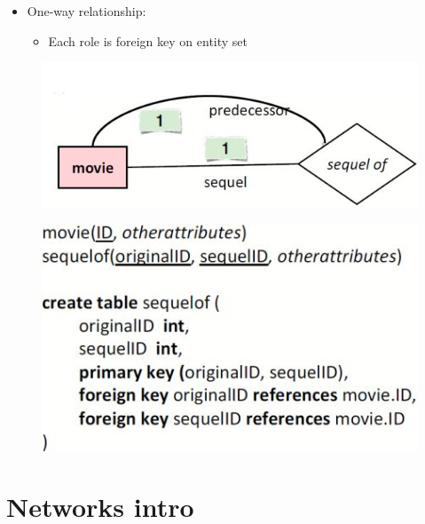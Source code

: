 \documentclass[conference]{IEEEtran}
\begin{document}
\begin{itemize}
    \item One-way relationship:
    \begin{itemize}
        \item Each role is foreign key on entity set
    \end{itemize}
\end{itemize}
\begin{figure} [h!]
    \centering
    \includegraphics[scale=0.5]{Ex32.JPG}
\end{figure}
\begin{figure} [h!]
    \centering
    \includegraphics[scale=0.5]{Ex33.JPG}
\end{figure}


\section{\textbf{Networks intro}}
\end{document}
